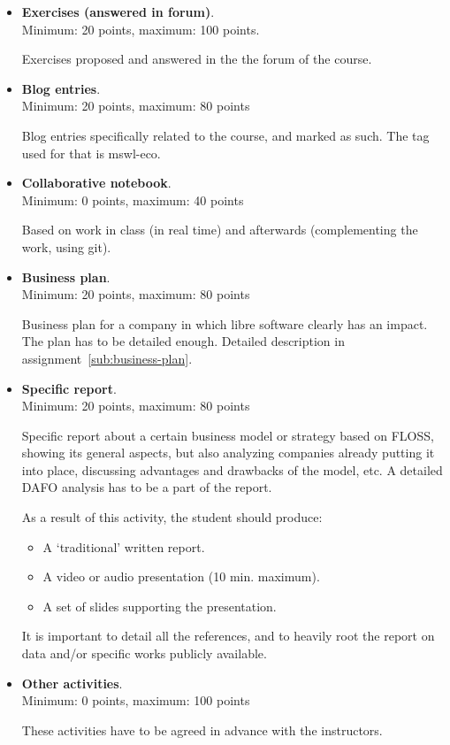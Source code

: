 \documentclass[a4paper]{article}
\begin{document}
\begin{itemize}
\item \textbf{Exercises (answered in forum)}. \\
  Minimum: 20 points, maximum: 100 points.

  Exercises proposed and answered in the the forum of the course.

\item \textbf{Blog entries}. \\
  Minimum: 20 points, maximum: 80 points

  Blog entries specifically related to the course, and marked as such. The tag used for that is mswl-eco.

\item \textbf{Collaborative notebook}. \\
  Minimum: 0 points, maximum: 40 points

  Based on work in class (in real time) and afterwards (complementing the work, using git).

\item \textbf{Business plan}. \\
  Minimum: 20 points, maximum: 80 points

  Business plan for a company in which libre software clearly has an impact. The plan has to be detailed enough. Detailed description in assignment~\ref{sub:business-plan}.

\item \textbf{Specific report}. \\
  Minimum: 20 points, maximum: 80 points

Specific report about a certain business model or strategy based on FLOSS, showing its general aspects, but also analyzing companies already putting it into place, discussing advantages and drawbacks of the model, etc. A detailed DAFO analysis has to be a part of the report.

As a result of this activity, the student should produce:

\begin{itemize}
\item A `traditional' written report.
\item A video or audio presentation (10 min. maximum).
\item A set of slides supporting the presentation.
\end{itemize}

 It is important to detail all the references, and to heavily root the report on data and/or specific works publicly available.

\item \textbf{Other activities}. \\
  Minimum: 0 points, maximum: 100 points

  These activities have to be agreed in advance with the instructors.
\end{itemize}
\end{document}
